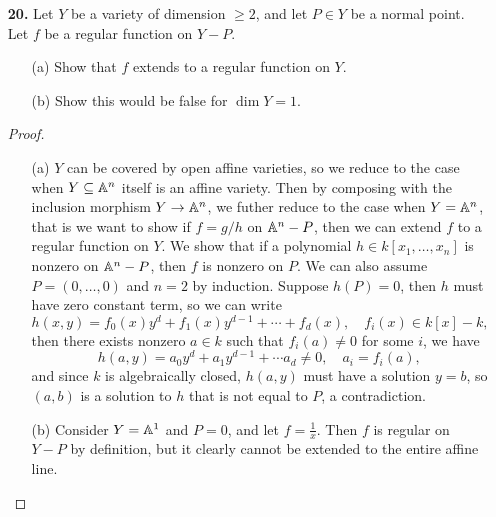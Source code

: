 \documentclass{article}
\begin{document}
\begin{enumerate} [label=\textbf{\arabic*.}, leftmargin=-0.05em]
\item[\textbf{20.}] Let $Y$ be a variety of dimension $\geq 2$, and let $P \in Y$ be a normal point. Let $f$ be a regular function on $Y - P$.
\begin{itemize}
    \item[(a)] Show that $f$ extends to a regular function on $Y$.
    \item[(b)] Show this would be false for $\dim{Y} = 1$.
\end{itemize}

\begin{proof} $ $ \vspace{0pt}
    \begin{itemize} [leftmargin=0cm]
        \item[(a)] $Y$ can be covered by open affine varieties, so we reduce to the case when $Y \subseteq \mathbb{A}^n$ itself is an affine variety.
        Then by composing with the inclusion morphism $Y \to \mathbb{A}^n$, we futher reduce to the case when $Y = \mathbb{A}^n$, that is we want to show if $f = g / h$ on $\mathbb{A}^n - P$, then we can extend $f$ to a regular function on $Y$.
        We show that if a polynomial $h \in k[x_1, \dots, x_n]$ is nonzero on $\mathbb{A}^n - P$, then $f$ is nonzero on $P$.
        We can also assume $P = (0, \dots, 0)$ and $n = 2$ by induction.
        Suppose $h(P) = 0$, then $h$ must have zero constant term, so we can write
        \begin{equation*}
            h(x, y) = f_0(x) y^d + f_1(x) y^{d - 1} + \cdots + f_d(x), \quad f_i(x) \in k[x] - k,
        \end{equation*}
        then there exists nonzero $a \in k$ such that $f_i(a) \neq 0$ for some $i$, we have
        \begin{equation*}
            h(a, y) = a_0 y^d + a_1 y^{d - 1} + \cdots a_d \neq 0, \quad a_i = f_i(a),
        \end{equation*}
        and since $k$ is algebraically closed, $h(a, y)$ must have a solution $y = b$, so $(a, b)$ is a solution to $h$ that is not equal to $P$, a contradiction.

        \item[(b)] Consider $Y = \mathbb{A}^1$ and $P = 0$, and let $f = \frac{1}{x}$. Then $f$ is regular on $Y - P$ by definition, but it clearly cannot be extended to the entire affine line.
    \end{itemize}
\end{proof}

\end{enumerate}
\end{document}
